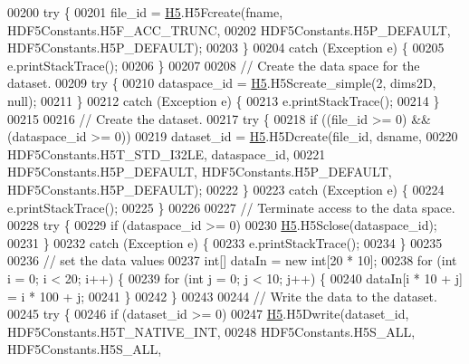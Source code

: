 \begin{DoxyCode}
00200         \textcolor{keywordflow}{try} \{
00201             file\_id = \hyperlink{namespace_h5}{H5}.H5Fcreate(fname, HDF5Constants.H5F\_ACC\_TRUNC,
00202                     HDF5Constants.H5P\_DEFAULT, HDF5Constants.H5P\_DEFAULT);
00203         \}
00204         \textcolor{keywordflow}{catch} (Exception e) \{
00205             e.printStackTrace();
00206         \}
00207 
00208         \textcolor{comment}{// Create the data space for the dataset.}
00209         \textcolor{keywordflow}{try} \{
00210             dataspace\_id = \hyperlink{namespace_h5}{H5}.H5Screate\_simple(2, dims2D, null);
00211         \}
00212         \textcolor{keywordflow}{catch} (Exception e) \{
00213             e.printStackTrace();
00214         \}
00215 
00216         \textcolor{comment}{// Create the dataset.}
00217         \textcolor{keywordflow}{try} \{
00218             \textcolor{keywordflow}{if} ((file\_id >= 0) && (dataspace\_id >= 0))
00219                 dataset\_id = \hyperlink{namespace_h5}{H5}.H5Dcreate(file\_id, dsname,
00220                         HDF5Constants.H5T\_STD\_I32LE, dataspace\_id,
00221                         HDF5Constants.H5P\_DEFAULT, HDF5Constants.H5P\_DEFAULT, HDF5Constants.H5P\_DEFAULT);
00222         \}
00223         \textcolor{keywordflow}{catch} (Exception e) \{
00224             e.printStackTrace();
00225         \}
00226 
00227         \textcolor{comment}{// Terminate access to the data space.}
00228         \textcolor{keywordflow}{try} \{
00229             \textcolor{keywordflow}{if} (dataspace\_id >= 0)
00230                 \hyperlink{namespace_h5}{H5}.H5Sclose(dataspace\_id);
00231         \}
00232         \textcolor{keywordflow}{catch} (Exception e) \{
00233             e.printStackTrace();
00234         \}
00235 
00236         \textcolor{comment}{// set the data values}
00237         \textcolor{keywordtype}{int}[] dataIn = \textcolor{keyword}{new} \textcolor{keywordtype}{int}[20 * 10];
00238         \textcolor{keywordflow}{for} (\textcolor{keywordtype}{int} i = 0; i < 20; i++) \{
00239             \textcolor{keywordflow}{for} (\textcolor{keywordtype}{int} j = 0; j < 10; j++) \{
00240                 dataIn[i * 10 + j] = i * 100 + j;
00241             \}
00242         \}
00243 
00244         \textcolor{comment}{// Write the data to the dataset.}
00245         \textcolor{keywordflow}{try} \{
00246             \textcolor{keywordflow}{if} (dataset\_id >= 0)
00247                 \hyperlink{namespace_h5}{H5}.H5Dwrite(dataset\_id, HDF5Constants.H5T\_NATIVE\_INT,
00248                         HDF5Constants.H5S\_ALL, HDF5Constants.H5S\_ALL,

\end{DoxyCode}

